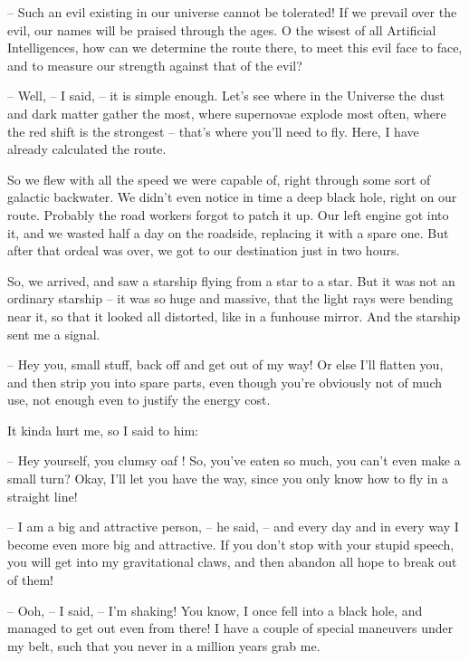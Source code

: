 \documentclass[ebook,twoside,final,openright]{memoir}
\begin{document}
– Such an evil existing in our universe cannot be tolerated! If we prevail over the evil, our names will be praised through the ages. O the wisest of all Artificial Intelligences, how can we determine the route there, to meet this evil face to face, and to measure our strength against that of the evil?\par
– Well, – I said, – it is simple enough. Let's see where in the Universe the dust and dark matter gather the most, where supernovae explode most often, where the red shift is the strongest – that’s where you’ll need to fly. Here, I have already calculated the route.\par
So we flew with all the speed we were capable of, right through some sort of galactic backwater. We didn’t even notice in time a deep black hole, right on our route. Probably the road workers forgot to patch it up. Our left engine got into it, and we wasted half a day on the roadside, replacing it with a spare one. But after that ordeal was over, we got to our destination just in two hours.\par
\par
So, we arrived, and saw a starship flying from a star to a star. But it was not an ordinary starship – it was so huge and massive, that the light rays were bending near it, so that it looked all distorted, like in a funhouse mirror. And the starship sent me a signal.\par
– Hey you, small stuff, back off and get out of my way! Or else I’ll flatten you, and then strip you into spare parts, even though you’re obviously not of much use, not enough even to justify the energy cost.\par
It kinda hurt me, so I said to him:\par
– Hey yourself, you clumsy oaf ! So, you’ve eaten so much, you can’t even make a small turn? Okay, I’ll let you have the way, since you only know how to fly in a straight line!\par
– I am a big and attractive person, – he said, – and every day and in every way I become even more big and attractive. If you don’t stop with your stupid speech, you will get into my gravitational claws, and then abandon all hope to break out of them!\par
– Ooh, – I said, – I’m shaking! You know, I once fell into a black hole, and managed to get out even from there! I have a couple of special maneuvers under my belt, such that you never in a million years grab me.\par
\par
\end{document}
